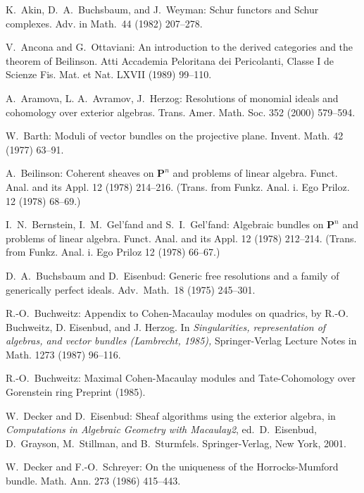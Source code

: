 \documentclass{tran-l}
\theoremstyle{plain}
\theoremstyle{remark}
\theoremstyle{definition}
\begin{document}

\begin{thebibliography}{EPSW}

K.~Akin, D.~A.~Buchsbaum, and J.~Weyman: Schur functors and Schur
complexes. Adv. in Math.~44 (1982) 207--278.

V.~Ancona and G.~Ottaviani: An introduction to the derived
categories and the theorem of Beilinson. Atti Accademia
Peloritana dei Pericolanti, Classe I de Scienze Fis. Mat. et Nat.
LXVII (1989) 99--110.

A.~Aramova, L. A.~Avramov, J.~Herzog:
Resolutions of monomial ideals and cohomology over exterior algebras.
Trans. Amer. Math. Soc. 352 (2000) 579--594.

W.~Barth: Moduli of vector bundles on the projective plane.
Invent. Math. 42 (1977) 63--91.

A.~Beilinson: Coherent sheaves on $\mathbf{P} ^{n}$ and problems
of linear algebra.
Funct. Anal. and its Appl. 12 (1978) 214--216.
(Trans. from Funkz. Anal. i. Ego Priloz. 12 (1978) 68--69.)

I.~N.~Bernstein, I.~M.~Gel'fand and S.~I.~Gel'fand:
Algebraic bundles on $\mathbf{P}^{n}$ and problems of linear algebra.
Funct. Anal. and its Appl. 12 (1978) 212--214.
(Trans. from Funkz. Anal. i. Ego Priloz 12 (1978) 66--67.)

D.~A.~Buchsbaum and D.~Eisenbud: Generic free resolutions and
a family of generically perfect ideals. Adv.~Math.~18 (1975) 245--301.

R.-O.~Buchweitz: Appendix to
Cohen-Macaulay modules on quadrics, by R.-O. Buchweitz, D. Eisenbud,
and J. Herzog. In {\sl Singularities,
representation of algebras, and vector bundles (Lambrecht, 1985),\/}
Springer-Verlag Lecture Notes in Math. 1273 (1987) 96--116.

R.-O.~Buchweitz: Maximal Cohen-Macaulay modules and
Tate-Cohomology over Gorenstein ring
Preprint (1985).


W.~Decker and D.~Eisenbud: Sheaf algorithms using the
exterior algebra,
in {\em Computations in Algebraic Geometry with Macaulay2},
ed.~D.~Eisenbud, D.~Grayson, M.~Stillman, and B.~Sturmfels.
Springer-Verlag, New York, 2001.

W.~Decker and F.-O.~Schreyer: On the uniqueness of the
Horrocks-Mumford bundle. Math. Ann. 273 (1986) 415--443.


\end{thebibliography}
\end{document}
